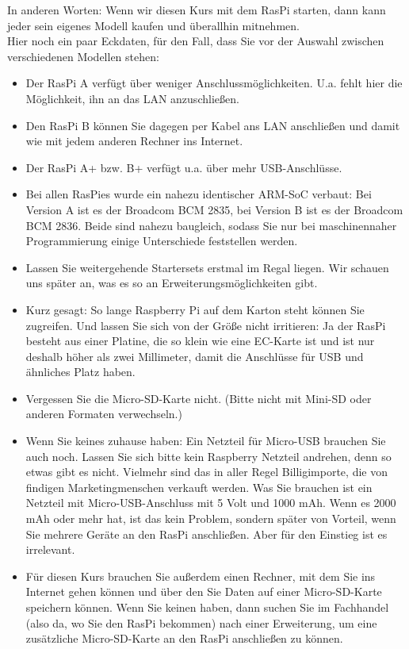In anderen Worten: Wenn wir diesen Kurs mit dem RasPi starten, dann kann jeder sein eigenes Modell kaufen und überallhin mitnehmen.\\

Hier noch ein paar Eckdaten, für den Fall, dass Sie vor der Auswahl zwischen verschiedenen Modellen stehen:

\begin{itemize}
	\item Der RasPi A verfügt über weniger Anschlussmöglichkeiten. U.a. fehlt hier die Möglichkeit, ihn an das LAN anzuschließen.
	\item Den RasPi B können Sie dagegen per Kabel ans LAN anschließen und damit wie mit jedem anderen Rechner ins Internet.
	\item Der RasPi A+ bzw. B+ verfügt u.a. über mehr USB-Anschlüsse.
	\item Bei allen RasPies wurde ein nahezu identischer ARM-SoC verbaut: Bei Version A ist es der Broadcom BCM 2835, bei Version B ist es der Broadcom BCM 2836. Beide sind nahezu baugleich, sodass Sie nur bei maschinennaher Programmierung einige Unterschiede feststellen werden.
	\item Lassen Sie weitergehende Startersets erstmal im Regal liegen. Wir schauen uns später an, was es so an Erweiterungsmöglichkeiten gibt.
	\item Kurz gesagt: So lange Raspberry Pi auf dem Karton steht können Sie zugreifen. Und lassen Sie sich von der Größe nicht irritieren: Ja der RasPi besteht aus einer Platine, die so klein wie eine EC-Karte ist und ist nur deshalb höher als zwei Millimeter, damit die Anschlüsse für USB und ähnliches Platz haben.
	\item Vergessen Sie die Micro-SD-Karte nicht. (Bitte nicht mit Mini-SD oder anderen Formaten verwechseln.)
	\item Wenn Sie keines zuhause haben: Ein Netzteil für Micro-USB brauchen Sie auch noch. Lassen Sie sich bitte kein \glqq{}Raspberry Netzteil\grqq{} andrehen, denn so etwas gibt es nicht. Vielmehr sind das in aller Regel Billigimporte, die von findigen Marketingmenschen verkauft werden. Was Sie brauchen ist ein Netzteil mit Micro-USB-Anschluss mit 5 Volt und 1000 mAh. Wenn es 2000 mAh oder mehr hat, ist das kein Problem, sondern später von Vorteil, wenn Sie mehrere Geräte an den RasPi anschließen. Aber für den Einstieg ist es irrelevant.
	\item Für diesen Kurs brauchen Sie außerdem einen Rechner, mit dem Sie ins Internet gehen können und über den Sie Daten auf einer Micro-SD-Karte speichern können. Wenn Sie keinen haben, dann suchen Sie im Fachhandel (also da, wo Sie den RasPi bekommen) nach einer Erweiterung, um eine zusätzliche Micro-SD-Karte an den RasPi anschließen zu können.\\

\end{itemize}
